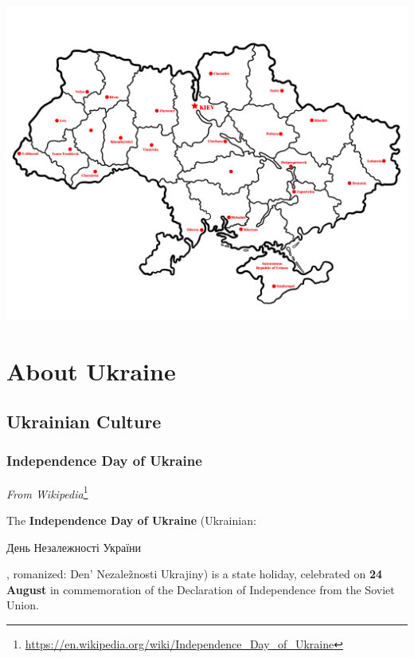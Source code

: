 \clearpage

\vspace{20mm}

\begin{minipage}{16cm}
\includegraphics[width=0.8\paperwidth]{Pictures/other/ukrainian-map-bw.png}
\end{minipage}

\clearpage

\part{About Ukraine}

\chapter{Ukrainian Culture}

\clearpage

\section{Independence Day of Ukraine}

\textit{From Wikipedia}\footnote{\url{https://en.wikipedia.org/wiki/Independence_Day_of_Ukraine}}

The \textbf{Independence Day of Ukraine} (Ukrainian: 
\begin{ukrainian}День Незалежності України\end{ukrainian},
romanized: Den' Nezale\~znosti Ukrajiny) is a state holiday, celebrated on \textbf{24 August}
in commemoration of the Declaration of Independence from the Soviet Union.

